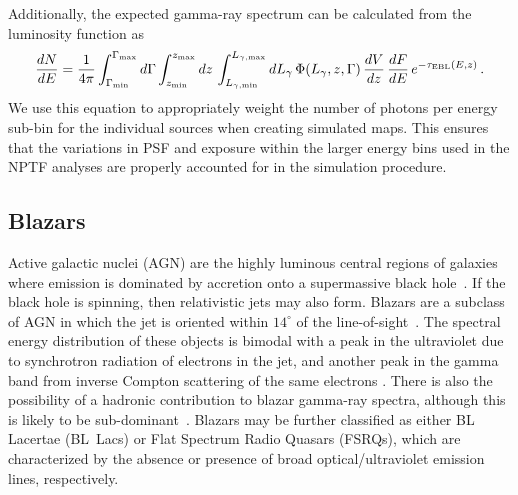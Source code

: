 Additionally, the expected gamma-ray spectrum can be calculated from the luminosity function as
\begin{equation}
\frac{dN}{dE} = \frac{1}{4\pi} \int_{\Gamma_\text{min}}^{\Gamma_\text{max}} d\Gamma \int_{z_\text{min}}^{z_\text{max}} dz \, \int_{L_{\gamma,\text{min}}}^{L_{\gamma,\text{max}}} dL_\gamma \, \Phi(L_\gamma,z,\Gamma) \, \frac{dV}{dz}\,\frac{dF}{dE} \, e^{-\tau_\text{\tiny{EBL}}(E,z)} \, .
\label{eq: dIdE}
\end{equation}
We use this equation to appropriately weight the number of photons per energy sub-bin for the individual sources when creating simulated maps. This ensures that the variations in PSF and exposure within the larger energy bins used in the NPTF analyses are properly accounted for in the simulation procedure.   
  

\subsection{Blazars}

Active galactic nuclei (AGN) are the highly luminous central regions of galaxies where emission is dominated by accretion onto a supermassive black hole~\cite{Urry:1995mg}.  If the black hole is spinning, then relativistic jets may also form.  Blazars are a subclass of AGN in which the jet is oriented within $14^\circ$ of the line-of-sight~\cite{Angel:1980}.  The spectral energy distribution of these objects is bimodal with a peak in the ultraviolet due to synchrotron radiation of electrons in the jet, and another peak in the gamma band from inverse Compton scattering of the same electrons \cite{Fossati:1998zn,Ghisellini:1998it,Ghisellini:2009fj,Boettcher:2013wxa}.  There is also the possibility of a hadronic contribution to blazar gamma-ray spectra, although this is likely to be sub-dominant~\cite{Tavecchio:2013fwa,Cerruti:2014iwa,Zdziarski:2015rsa}. Blazars may be further classified as either BL Lacertae (BL~Lacs) or Flat Spectrum Radio Quasars (FSRQs), which are characterized by the absence or presence of broad optical/ultraviolet emission lines, respectively.  

